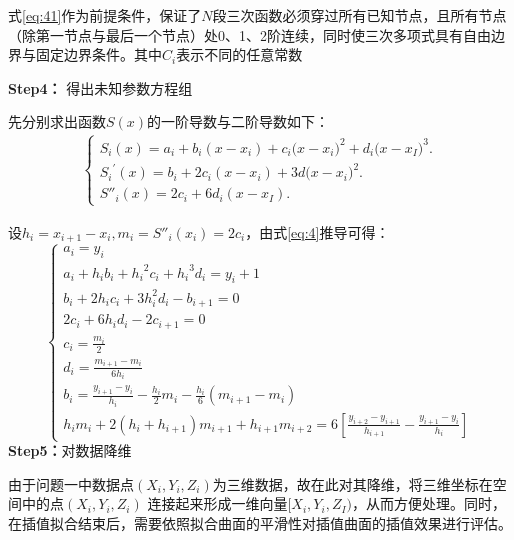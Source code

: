 \documentclass[withoutpreface,bwprint]{cumcmthesis}
\begin{document}
	式\eqref{eq:41}作为前提条件，保证了$N$段三次函数必须穿过所有已知节点，且所有节点（除第一节点与最后一个节点）处0、1、2阶连续，同时使三次多项式具有自由边界与固定边界条件。其中$C_i$表示不同的任意常数

	\textbf{Step4：}	得出未知参数方程组
	
	先分别求出函数$S(x)$的一阶导数与二阶导数如下：
\begin{align*}
	\left \{{\begin{matrix}{{S}_{i}}(x)={{a}_{i}}+{{b}_{i}}(x-{{x}_{i}})+{{c}_{i}}(x-{{x}_{i}}{{)}^{2}}+{{d}_{i}}(x-{{x}_{I}}{{)}^{3}}.\\{{{{S}_{i}}}^{'}}(x)={{b}_{i}}+2{{c}_{i}}(x-{{x}_{i}})+3d(x-{{x}_{i}}{{)}^{2}}.\\{{S''}_{i}}(x)=2{{c}_{i}}+6{{d}_{i}}(x-{{x}_{I}}).\end{matrix}}\right .
\end{align*}

	设$h_i=x_{i+1}-x_i, m_i={{S''}_i}(x_i)=2c_i$，由式\eqref{eq:4}推导可得：
	\begin{equation}
		\left\{ {\begin{array}{*{20}{c}}
				{{a_i} = {y_i}}\\
				{{a_i} + {h_i}{b_i} + {h_i}^2{c_i} + {h_i}^3{d_i} = {y_i} + 1}\\
				{{b_i} + 2{h_i}{c_i} + 3h_i^2{d_i} - {b_{i + 1}} = 0}\\
				{2{c_i} + 6{h_i}{d_i} - 2{c_{i + 1}} = 0}\\
				{{c_i} = \frac{{{m_i}}}{2}}\\
				{{d_i} = \frac{{{m_{i + 1}} - {m_i}}}{{6{h_i}}}}\\
				{{b_i} = \frac{{{y_{i + 1}} - {y_i}}}{{{h_i}}} - \frac{{{h_i}}}{2}{m_i} - \frac{{{h_i}}}{6}({m_{i + 1}} - {m_i})}\\
				{{h_i}{m_i} + 2({h_i} + {h_{i + 1}}){m_{i + 1}} + {h_{i + 1}}{m_{i + 2}} = 6[\frac{{{y_{i + 2}} - {y_{i + 1}}}}{{{h_{i + 1}}}} - \frac{{{y_{i + 1}} - {y_i}}}{{{h_i}}}]}
		\end{array}} \right.
	\end{equation}
	\textbf{Step5：}对数据降维
	
	由于问题一中数据点$(X_i,Y_i,Z_i)$为三维数据，故在此对其降维，将三维坐标在空间中的点$(X_i,Y_i,Z_i)$ 连接起来形成一维向量$[X_i,Y_i,Z_I)$，从而方便处理。同时，在插值拟合结束后，需要依照拟合曲面的平滑性对插值曲面的插值效果进行评估。
	
\end{document}

